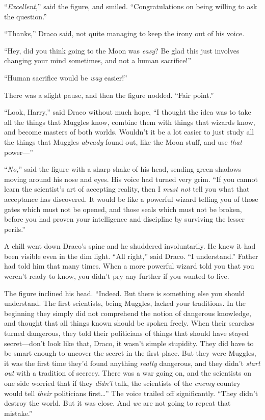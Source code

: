 “\emph{Excellent},” said the figure, and smiled. “Congratulations on being willing to ask the question.”

“Thanks,” Draco said, not quite managing to keep the irony out of his voice.

“Hey, did you think going to the Moon was \emph{easy}? Be glad this just involves changing your mind sometimes, and not a human sacrifice!”

“Human sacrifice would be \emph{way} easier!”

There was a slight pause, and then the figure nodded. “Fair point.”

“Look, Harry,” said Draco without much hope, “I thought the idea was to take all the things that Muggles know, combine them with things that wizards know, and become masters of both worlds. Wouldn’t it be a lot easier to just study all the things that Muggles \emph{already} found out, like the Moon stuff, and use \emph{that} power—”

“\emph{No,}” said the figure with a sharp shake of his head, sending green shadows moving around his nose and eyes. His voice had turned very grim. “If you cannot learn the scientist’s art of accepting reality, then I \emph{must not} tell you what that acceptance has discovered. It would be like a powerful wizard telling you of those gates which must not be opened, and those seals which must not be broken, before you had proven your intelligence and discipline by surviving the lesser perils.”

A chill went down Draco’s spine and he shuddered involuntarily. He knew it had been visible even in the dim light. “All right,” said Draco. “I understand.” Father had told him that many times. When a more powerful wizard told you that you weren’t ready to know, you didn’t pry any further if you wanted to live.

The figure inclined his head. “Indeed. But there is something else you should understand. The first scientists, being Muggles, lacked your traditions. In the beginning they simply did not comprehend the notion of dangerous knowledge, and thought that all things known should be spoken freely. When their searches turned dangerous, they told their politicians of things that should have stayed secret—don’t look like that, Draco, it wasn’t simple stupidity. They did have to be smart enough to uncover the secret in the first place. But they were Muggles, it was the first time they’d found anything \emph{really} dangerous, and they didn’t \emph{start out} with a tradition of secrecy. There was a war going on, and the scientists on one side worried that if they \emph{didn’t} talk, the scientists of the \emph{enemy} country would tell \emph{their} politicians first…” The voice trailed off significantly. “They didn’t destroy the world. But it was close. And \emph{we} are not going to repeat that mistake.”

